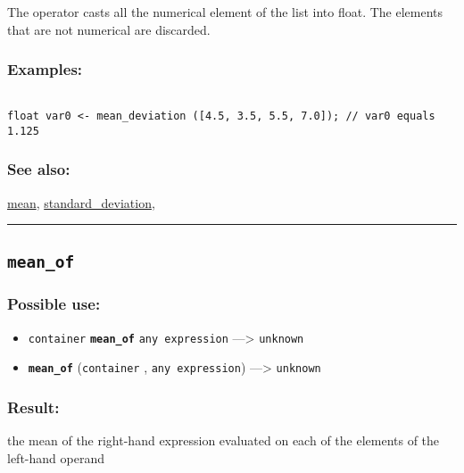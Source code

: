 \documentclass[]{book}
\providecommand{\tightlist}{%
  \setlength{\itemsep}{0pt}\setlength{\parskip}{0pt}}
\theoremstyle{definition}
\theoremstyle{definition}
\theoremstyle{definition}
\theoremstyle{remark}
\begin{document}
The operator casts all the numerical element of the list into float. The
elements that are not numerical are discarded.

\subsubsection{Examples:}\label{examples-237}

\begin{verbatim}
 
float var0 <- mean_deviation ([4.5, 3.5, 5.5, 7.0]); // var0 equals 1.125
\end{verbatim}

\subsubsection{See also:}\label{see-also-138}

\href{OperatorsIM\#mean}{mean},
\href{OperatorsSZ\#standard_deviation}{standard\_deviation},

\begin{center}\rule{0.5\linewidth}{\linethickness}\end{center}

\subsection{\texorpdfstring{\texttt{mean\_of}}{mean\_of}}\label{mean_of}

\subsubsection{Possible use:}\label{possible-use-345}

\begin{itemize}
\tightlist
\item
  \texttt{container} \textbf{\texttt{mean\_of}} \texttt{any\ expression}
  ---\textgreater{} \texttt{unknown}
\item
  \textbf{\texttt{mean\_of}} (\texttt{container} ,
  \texttt{any\ expression}) ---\textgreater{} \texttt{unknown}
\end{itemize}

\subsubsection{Result:}\label{result-334}

the mean of the right-hand expression evaluated on each of the elements
of the left-hand operand
\end{document}
